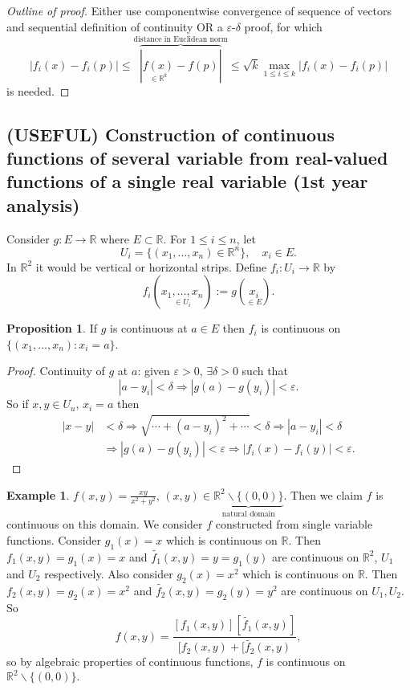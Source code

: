 \documentclass[a4paper]{article}
\theoremstyle{definition}
\newtheorem{prop}[defn]{Proposition}
\newtheorem{eg}[defn]{Example}
\begin{document}
\begin{proof}[Outline of proof]
	Either use componentwise convergence of sequence of vectors and sequential definition of continuity OR a $\varepsilon$-$\delta$ proof, for which
\[
|f_i(x)-f_i(p)|\leq \overbrace{|\underset{\in \mathbb R^k}{f(x)}-f(p)|}^{\text{distance in Euclidean norm}} \leq \sqrt k \underset{1 \leq i \leq k}{\max} |f_i(x)-f_i(p)|
\]
is needed. 
\end{proof}

\subsection{(USEFUL) Construction of continuous functions of several variable from real-valued functions of a single real variable (1st year analysis)}

Consider $g:E\rightarrow \mathbb R$ where $E\subset \mathbb R$. For $1 \leq i \leq n$, let
\[
U_i=\{(x_1,\ldots,x_n) \in \mathbb R^n\}, \quad x_i \in E .
\]
In $\mathbb R^2$ it would be vertical or horizontal strips. Define $f_i: U_i \rightarrow \mathbb R$ by
\[
f_i(\underset{\in U_i}{x_1,\ldots,x_n}):=g(\underset{\in E}{x_i}) .
\]

\begin{prop}If $g$ is continuous at $a \in E$ then $f_i$ is continuous on $\{(x_1,\ldots,x_n): x_i=a\}$.\end{prop}
\begin{proof}
	Continuity of $g$ at $a$: given $\varepsilon >0$, $\exists \delta >0$ such that
\[
|a-y_i|<\delta \Rightarrow |g(a)-g(y_i)| < \varepsilon .
\]
So if $x,y\in U_u$, $x_i=a$ then
\[
\begin{aligned}
		|x-y|&<\delta \Rightarrow \sqrt{\cdots+(a-y_i)^2+\cdots} < \delta \Rightarrow |a-y_i|<\delta \\&\Rightarrow |g(a)-g(y_i)|<\varepsilon \Rightarrow |f_i(x)-f_i(y)|<\varepsilon .
	\end{aligned}
\]
\end{proof} 

\begin{eg}
	$f(x,y)=\frac{xy}{x^2+y^2}$, $(x,y)\in \underbrace{\mathbb R^2\backslash\{(0,0)\}}_{\text{natural domain}}$. Then we claim $f$ is continuous on this domain. We consider $f$ constructed from single variable functions. Consider $g_1(x)=x$ which is continuous on $\mathbb R$. Then $f_1(x,y)=g_1(x)=x$ and $\tilde{f_1}(x,y)=y=g_1(y)$ are continuous on $\mathbb R^2$, $U_1$ and $U_2$ respectively. Also consider $g_2(x)=x^2$ which is continuous on $\mathbb R$. Then $f_2(x,y)=g_2(x)=x^2$ and $\tilde{f_2}(x,y)=g_2(y)=y^2$ are continuous on $U_1,U_2$. So
\[
f(x,y)=\frac{[f_1(x,y)][\tilde{f_1}(x,y)]}{[f_2(x,y)+[\tilde{f_2}(x,y)},
\]
so by algebraic properties of continuous functions, $f$ is continuous on $\mathbb R^2\backslash\{(0,0)\} .$
\end{eg}
\end{document}
